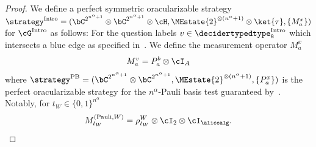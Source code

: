 \begin{proof}

	
	We define a perfect symmetric oracularizable strategy $\strategy^{\text{Intro}} = (\bC^{2^{n^\alpha +1} } \otimes \bC^{2^{n^{\alpha} +1}} \otimes \cH, \MEstate{2}^{\otimes (n^\alpha +1)}\otimes \ket{\tau}, \{ M^x_a\} )$ for $\cG^{\text{Intro}}$ as follows: For the question labels $v \in  \decidertypedtype^{\text{Intro}}_k$ which intersects a blue edge as specified in~. We define the measurement operator $M^x_a$
	\begin{align*}
		M^v_a = P_a^b \otimes \cI_{A}
	\end{align*}
	where $\strategy^{\text{PB}} = (\bC^{2^{n^{\alpha} +1}} \otimes \bC^{2^{n^{\alpha} +1}} , \MEstate{2}^{\otimes (n^{\alpha} +1)}, \{P_a^x \})$ is the perfect oracularizable strategy for the $n^{\alpha}$-Pauli basis test guaranteed by~. Notably, for $t_W \in \{0,1\}^{n^{\alpha}}$
	\begin{equation*}
		M^{(\text{Pauli}, W)}_{t_W} = \rho_{t_W}^{W} \otimes \cI_2 \otimes \cI_{\alicealg}.
	\end{equation*}
	

\end{proof}
